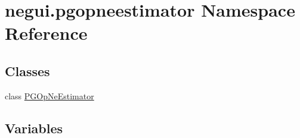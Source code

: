 \hypertarget{namespacenegui_1_1pgopneestimator}{}\section{negui.\+pgopneestimator Namespace Reference}
\label{namespacenegui_1_1pgopneestimator}
\subsection*{Classes}
\begin{DoxyCompactItemize}
\item 
class \hyperlink{classnegui_1_1pgopneestimator_1_1PGOpNeEstimator}{P\+G\+Op\+Ne\+Estimator}
\end{DoxyCompactItemize}
\subsection*{Variables}
